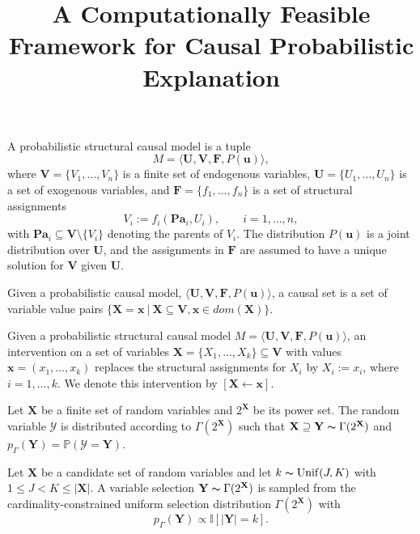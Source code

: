 \documentclass[anon,12pt]{clear2025} %
\title[Explainable]{A Computationally Feasible Framework for  Causal Probabilistic Explanation}
\begin{document}
  
\begin{definition}
A probabilistic structural causal model is a tuple
\[
M = \langle \mathbf{U}, \mathbf{V}, \mathbf{F}, P(\mathbf{u}) \rangle,
\]
where \(\mathbf{V} = \{V_1,\dots,V_n\}\) is a finite set of endogenous variables,
\(\mathbf{U} = \{U_1,\dots,U_n\}\) is a set of exogenous variables,
and \(\mathbf{F} = \{f_1,\dots,f_n\}\) is a set of structural assignments
\[
V_i := f_i(\mathbf{Pa}_i, U_i), \qquad i = 1,\dots,n,
\]
with \(\mathbf{Pa}_i \subseteq \mathbf{V}\setminus\{V_i\}\) denoting the parents of \(V_i\).
The distribution \(P(\mathbf{u})\) is a joint distribution over \(\mathbf{U}\),
and the assignments in \(\mathbf{F}\) are assumed to have a unique solution for \(\mathbf{V}\) given \(\mathbf{U}\).
\end{definition}




\begin{definition}
    Given a probabilistic causal model,  \(\langle \mathbf{U}, \mathbf{V}, \mathbf{F}, P(\mathbf{u})\rangle\), a causal set is a set of variable value pairs \(\{\mathbf{X} = \mathbf{x} ~|~ \mathbf{X} \subseteq  \mathbf{V}, \mathbf{x} \in \mathit{dom}(\mathbf{X})\}\). 
\end{definition}


\begin{definition}[Interventions]
Given a probabilistic structural causal model
\(M = \langle \mathbf{U}, \mathbf{V}, \mathbf{F}, P(\mathbf{u}) \rangle\),
an intervention on a set of variables \(\mathbf{X} = \{X_1, \dots, X_k\} \subseteq \mathbf{V}\)
with values \(\mathbf{x} = (x_1, \dots, x_k)\) replaces the structural assignments for \(X_i\) by $X_i := x_i$, where $i = 1, \dots, k$.  We denote this intervention by \([\mathbf{X} \leftarrow \mathbf{x}]\).
\end{definition}


\begin{definition}
Let $\mathbf{X}$ be a finite set of random variables and $2^\mathbf{X}$ be its power set. The random variable $\mathcal{Y}$ is distributed according to $\Gamma(2^\mathbf{X})$ such that $ \mathbf{X} \supseteq \mathbf{Y} \thicksim \Gamma(2^\mathbf{X})$ and $p_\Gamma(\mathbf{Y}) = \mathbb{P}(\mathcal{Y} = \mathbf{Y})$.
\end{definition}


\begin{example}
Let $\mathbf{X}$ be a candidate set of random variables and let $k \thicksim \mathrm{Unif}(J, K)$ with $1 \leq J < K \leq |\mathbf{X}|$. A variable selection $\mathbf{Y} \thicksim \Gamma(2^\mathbf{X})$ is sampled from the cardinality-constrained uniform selection distribution $\Gamma(2^\mathbf{X})$ with
\[
p_\Gamma(\mathbf{Y}) \propto \mathbb{I}[|\mathbf{Y}| = k].
\]
\end{example}
\end{document}

